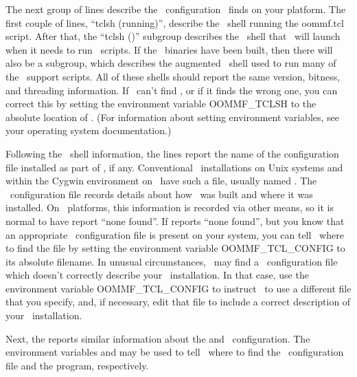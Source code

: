 The next group of lines describe the \Tcl\ configuration \OOMMF\ finds
on your platform.  The first couple of lines, ``tclsh (running)'',
describe the \Tcl\ shell running the oommf.tcl script.  After that, the
``tclsh (\OOMMF)'' subgroup describes the \Tcl\ shell that \OOMMF\ will
launch when it needs to run \Tcl\ scripts.  If the \OOMMF\ binaries
have been built, then there will also be a  subgroup, which
describes the augmented \Tcl\ shell used to run many of the
\OOMMF\ support scripts.  All of these shells should report the same
version, bitness, and threading information.  If \OOMMF\ can't find
, or if it finds the wrong one, you can correct this by
setting the environment variable
OOMMF\_TCLSH to the absolute
location of .  (For information about setting environment
variables, see your operating system documentation.)

Following the \Tcl\ shell information, the  lines
report the name of the configuration file installed as part of \Tcl, if
any.  Conventional \Tcl\ installations on Unix systems and within the
Cygwin environment on
\Windows\ have such a file, usually named .  The
\Tcl\ configuration file records details about how \Tcl\ was built and
where it was installed.  On \Windows\ platforms, this information is
recorded via other means, so
it is normal to have  report ``none found''.  If
 reports ``none found'', but you know that an
appropriate \Tcl\ configuration file is present on your system, you can
tell \OOMMF\ where to find the file by setting the environment variable
OOMMF\_TCL\_CONFIG to
its absolute filename.  In unusual circumstances, \OOMMF\ may find a
\Tcl\ configuration file which doesn't correctly describe your
\Tcl\ installation.  In that case, use the environment variable
OOMMF\_TCL\_CONFIG to instruct \OOMMF\ to use a different file that you
specify, and, if necessary, edit that file to include a correct
description of your \Tcl\ installation.

Next, the  reports similar information about the
 and \Tk\ configuration.  The environment variables
and  may be
used to tell \OOMMF\ where to find the \Tk\ configuration file and the
 program, respectively.

